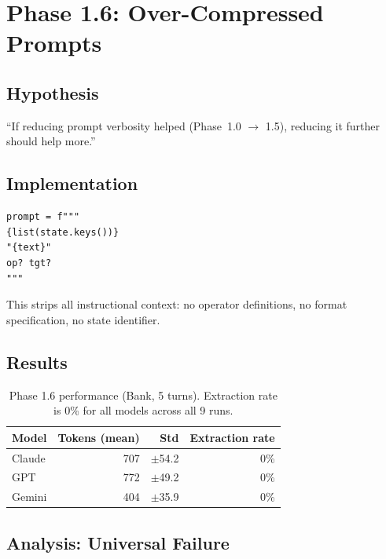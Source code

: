 \documentclass[11pt,a4paper]{article}
\begin{document}
\section{Phase 1.6: Over-Compressed Prompts}
\label{sec:phase1_6}

\subsection{Hypothesis}

``If reducing prompt verbosity helped (Phase~1.0 $\rightarrow$ 1.5), reducing it
further should help more.''

\subsection{Implementation}

\begin{lstlisting}
prompt = f"""
{list(state.keys())}
"{text}"
op? tgt?
"""
\end{lstlisting}

This strips all instructional context: no operator definitions, no format
specification, no state identifier.

\subsection{Results}

\begin{table}[ht]
\centering
\begin{tabular}{lrrr}
\toprule
\textbf{Model} & \textbf{Tokens (mean)} & \textbf{Std} & \textbf{Extraction rate} \\
\midrule
Claude & 707 & $\pm$54.2 & 0\% \\
GPT & 772 & $\pm$49.2 & 0\% \\
Gemini & 404 & $\pm$35.9 & 0\% \\
\bottomrule
\end{tabular}
\caption{Phase 1.6 performance (Bank, 5 turns). Extraction rate is 0\% for
all models across all 9 runs.}
\label{tab:phase1_6}
\end{table}

\subsection{Analysis: Universal Failure}
\end{document}
